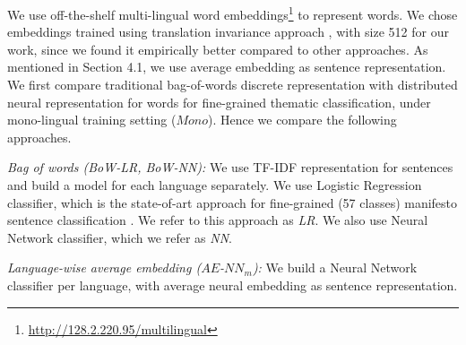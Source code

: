 \documentclass[11pt,a4paper]{article}
\begin{document}
We use off-the-shelf multi-lingual word embeddings\footnote{\url{http://128.2.220.95/multilingual}} to represent words. We chose embeddings trained using translation invariance approach \cite{ammar2016massively}, with size 512 for our work, since we found it empirically better compared to other approaches. As mentioned in Section 4.1, we use average embedding as sentence representation. We first compare traditional bag-of-words discrete representation with distributed neural representation for words for fine-grained thematic classification, under mono-lingual training setting ($Mono$). Hence we compare the following approaches. 

\begin{description}
\item{\textit{Bag of words (BoW-LR, BoW-NN):}} We use TF-IDF representation for sentences and build a model for each language separately. We use Logistic Regression classifier, which is the state-of-art approach for fine-grained (57 classes) manifesto sentence classification \cite{biessmann2016automating}. We refer to this approach as \textit{LR}. We also use Neural Network classifier, which we refer as \textit{NN}.

\item{\textit{Language-wise average embedding ($AE$-$NN_{m}$):}} We build a Neural Network classifier per language, with average neural embedding as sentence representation.
\end{description}


\end{document}
